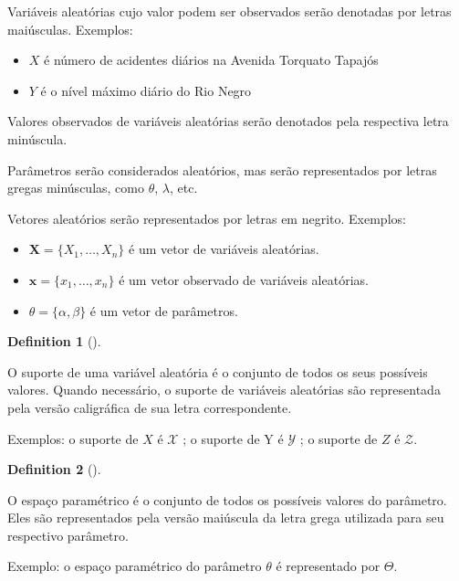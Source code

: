 \documentclass[
  letterpaper,
  DIV=11,
  numbers=noendperiod]{scrreprt}
\theoremstyle{definition}
\theoremstyle{definition}
\newtheorem{definition}{Definition}[chapter]
\theoremstyle{remark}
\begin{document}
Variáveis aleatórias cujo valor podem ser observados serão denotadas por
letras maiúsculas. Exemplos:

\begin{itemize}
\item
  \(X\) é número de acidentes diários na Avenida Torquato Tapajós
\item
  \(Y\) é o nível máximo diário do Rio Negro
\end{itemize}

Valores observados de variáveis aleatórias serão denotados pela
respectiva letra minúscula.

Parâmetros serão considerados aleatórios, mas serão representados por
letras gregas minúsculas, como \(\theta\), \(\lambda\), etc.

Vetores aleatórios serão representados por letras em negrito. Exemplos:

\begin{itemize}
\item
  \(\mathbf{X} = \{X_1 , \ldots , X_n \}\) é um vetor de variáveis
  aleatórias.
\item
  \(\mathbf{x} = \{x_1 ,\ldots , x_n \}\) é um vetor observado de
  variáveis aleatórias.
\item
  \(\theta=\{\alpha,\beta\}\) é um vetor de parâmetros.
\end{itemize}

\begin{definition}[]\protect\hypertarget{def-Suporte}{}\label{def-Suporte}

O suporte de uma variável aleatória é o conjunto de todos os seus
possíveis valores. Quando necessário, o suporte de variáveis aleatórias
são representada pela versão caligráfica de sua letra correspondente.

Exemplos: o suporte de \(X\) é \(\mathcal{X}\) ; o suporte de Y é
\(\mathcal{Y}\) ; o suporte de \(Z\) é \(\mathcal{Z}\).

\end{definition}

\begin{definition}[]\protect\hypertarget{def-Espaco}{}\label{def-Espaco}

O espaço paramétrico é o conjunto de todos os possíveis valores do
parâmetro. Eles são representados pela versão maiúscula da letra grega
utilizada para seu respectivo parâmetro.

Exemplo: o espaço paramétrico do parâmetro \(\theta\) é representado por
\(\Theta\).

\end{definition}
\end{document}
